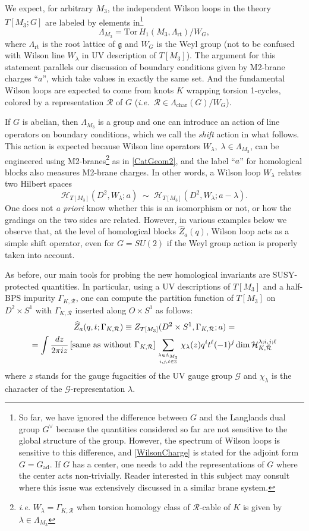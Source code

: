 \documentclass[hyper,letterpaper]{JHEP3}
\newcommand{\be}{\begin{equation}}
\newcommand{\ee}{\end{equation}}
\newcommand{\Z}{{\mathbb Z}}
\def\frak{\mathfrak}
\renewcommand{\hat}{\widehat}
\def\CG{{\mathcal G}}
\def\CH{{\mathcal H}}
\def\CR{{\mathcal R}}
\def\ie{{\textit{i.e.}}}
\begin{document}
We expect, for arbitrary $M_3$, the independent Wilson loops in the theory $T[M_3;G]$ are labeled by elements in\footnote{So far, we have ignored the difference between $G$ and the Langlands dual group $G^\vee$ because the quantities considered so far are not sensitive to the global structure of the group. However, the spectrum of Wilson loops is sensitive to this difference, and \eqref{WilsonCharge} is stated for the adjoint form $G=G_{\text{ad}}$. If $G$ has a center, one needs to add the representations of $G$ where the center acts non-trivially. Reader interested in this subject may consult \cite{EVFCBI} where this issue was extensively discussed in a similar brane system.\label{ft:Global}}
\be\label{WilsonCharge}
\Lambda_{M_3}=\mathrm{Tor}\,H_1(M_3,\Lambda_{\text{rt}})/W_G,
\ee
where $\Lambda_{\text{rt}}$ is the root lattice of $\frak{g}$ and $W_G$ is the Weyl group (not to be confused with Wilson line $W_{\lambda}$ in UV description of $T[M_3]$). The argument for this statement parallels our discussion of boundary conditions given by M2-brane charges ``$a$'', which take values in exactly the same set. And the fundamental Wilson loops are expected to come from knots $K$ wrapping torsion 1-cycles, colored by a representation $\CR$ of $G$ (\ie~$\CR\in \Lambda_{\text{char}}(G)/W_G$).

If $G$ is abelian, then $\Lambda_{M_3}$ is a group and one can introduce an action of line operators on boundary conditions, which we call the {\it shift} action in what follows. This action is expected because Wilson line operators $W_\lambda,\;\lambda\in \Lambda_{M_3}$, can be engineered using M2-branes\footnote{{\it i.e.} $W_\lambda=\Gamma_{K,\CR}$ when torsion homology class of $\CR$-cable of $K$ is given by $\lambda\in  \Lambda_{M_3}$} as in \eqref{CatGeom2}, and the label ``$a$'' for homological blocks also measures M2-brane charges.
In other words, a Wilson loop $W_\lambda$ relates two Hilbert spaces
\be
\CH_{T[M_3]}(D^2,W_\lambda;a) \; \sim \; \CH_{T[M_3]}(D^2,W_\lambda;a-\lambda).
\ee
One does not \textit{a priori} know whether this is an isomorphism or not, or how the gradings on the two sides are related.
However, in various examples below we observe that, at the level of homological blocks $\hat{Z}_a(q)$,
Wilson loop acts as a simple shift operator, even for $G=SU(2)$ if the Weyl group action is properly taken into account.

As before, our main tools for probing the new homological invariants are SUSY-protected quantities.
In particular, using a UV descriptions of $T[M_3]$ and a half-BPS impurity $\Gamma_{K,\CR}$,
one can compute the partition function of $T[M_3]$ on $D^2\times S^1$ with $\Gamma_{K,\CR}$ inserted along $O\times S^1$ as follows:
\begin{multline}\label{BlockKnot}
	\hat{Z}_a(q,t;\Gamma_{K,\CR})\equiv Z_{T[M_3]}(D^2\times S^1,\Gamma_{K,\CR};a)=\\ =\int \frac{dz}{2\pi i z}
	\,[\text{same as without $\Gamma_{K,\CR}$}] \sum_{\lambda\in \Lambda_{M_3}\atop i,j,\ell \in\Z}\chi_\lambda(z)q^it^\ell(-1)^{j}
	\dim\CH_{K,\CR}^{\lambda;i,j;\ell}
\end{multline}
where $z$ stands for the gauge fugacities of the UV gauge group $\CG$
and $\chi_\lambda$ is the character of the $\CG$-representation $\lambda$.
\end{document}
